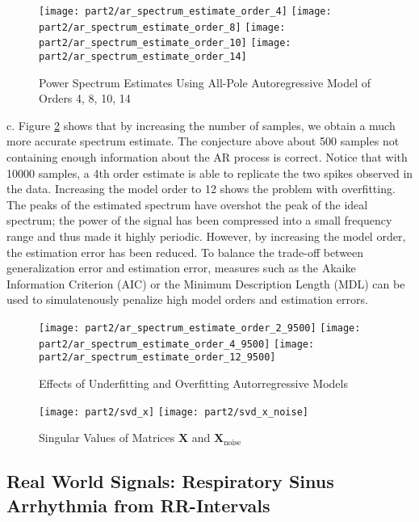 \begin{figure}[H]
\centering{}
\texttt{[image: part2/ar\_spectrum\_estimate\_order\_4]}
\texttt{[image: part2/ar\_spectrum\_estimate\_order\_8]}
\texttt{[image: part2/ar\_spectrum\_estimate\_order\_10]}
\texttt{[image: part2/ar\_spectrum\_estimate\_order\_14]}
\caption{Power Spectrum Estimates Using All-Pole Autoregressive Model of Orders 4, 8, 10, 14}
\label{fig:AR_1000}
\end{figure}

\noindent{}c. Figure \ref{fig:AR_10000} shows that by increasing the number of samples, we obtain a much more accurate spectrum estimate. The conjecture above about 500 samples not containing enough information about the AR process is correct. Notice that with 10000 samples, a 4th order estimate is able to replicate the two spikes observed in the data. Increasing the model order to 12 shows the problem with overfitting. The peaks of the estimated spectrum have overshot the peak of the ideal spectrum; the power of the signal has been compressed into a small frequency range and thus made it highly periodic. However, by increasing the model order, the estimation error has been reduced. To balance the trade-off between generalization error and estimation error, measures such as the Akaike Information Criterion (AIC) or the Minimum Description Length (MDL) can be used to simulatenously penalize high model orders and estimation errors. 

\begin{figure}[H]
\centering{}
\texttt{[image: part2/ar\_spectrum\_estimate\_order\_2\_9500]}
\texttt{[image: part2/ar\_spectrum\_estimate\_order\_4\_9500]}
\texttt{[image: part2/ar\_spectrum\_estimate\_order\_12\_9500]}
\caption{Effects of Underfitting and Overfitting Autorregressive Models}
\label{fig:AR_10000}
\end{figure}


\begin{figure}[H]
\centering{}
\texttt{[image: part2/svd\_x]}
\texttt{[image: part2/svd\_x\_noise]}
\caption{Singular Values of Matrices $\textbf{X}$ and $\textbf{X}_{\text{noise}}$}
\end{figure}

\subsection{Real World Signals: Respiratory Sinus Arrhythmia from RR-Intervals}

